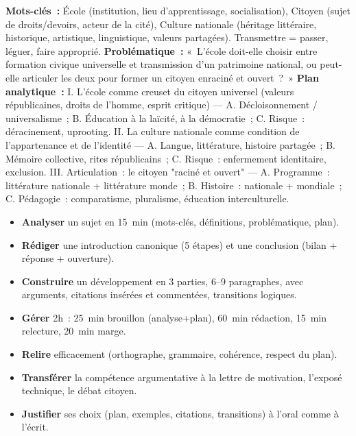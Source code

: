 \documentclass[11pt]{article}
\begin{document}
\begin{corrige}
\textbf{Mots-clés~:} École (institution, lieu d'apprentissage, socialisation), Citoyen (sujet de droits/devoirs, acteur de la cité), Culture nationale (héritage littéraire, historique, artistique, linguistique, valeurs partagées). Transmettre = passer, léguer, faire approprié.
\textbf{Problématique~:} «~L'école doit-elle choisir entre formation civique universelle et transmission d'un patrimoine national, ou peut-elle articuler les deux pour former un citoyen enraciné et ouvert~?~»
\textbf{Plan analytique~:}
I. L'école comme creuset du citoyen universel (valeurs républicaines, droits de l'homme, esprit critique) — A. Décloisonnement / universalisme~; B. Éducation à la laïcité, à la démocratie~; C. Risque~: déracinement, uprooting.
II. La culture nationale comme condition de l'appartenance et de l'identité — A. Langue, littérature, histoire partagée~; B. Mémoire collective, rites républicains~; C. Risque~: enfermement identitaire, exclusion.
III. Articulation~: le citoyen "raciné et ouvert" — A. Programme~: littérature nationale + littérature monde~; B. Histoire~: nationale + mondiale~; C. Pédagogie~: comparatisme, pluralisme, éducation interculturelle.
\end{corrige}

\begin{aretenir}
\begin{itemize}
    \item \textbf{Analyser} un sujet en 15~min (mots-clés, définitions, problématique, plan).
    \item \textbf{Rédiger} une introduction canonique (5 étapes) et une conclusion (bilan + réponse + ouverture).
    \item \textbf{Construire} un développement en 3 parties, 6--9 paragraphes, avec arguments, citations insérées et commentées, transitions logiques.
    \item \textbf{Gérer} 2h~: 25~min brouillon (analyse+plan), 60~min rédaction, 15~min relecture, 20~min marge.
    \item \textbf{Relire} efficacement (orthographe, grammaire, cohérence, respect du plan).
    \item \textbf{Transférer} la compétence argumentative à la lettre de motivation, l'exposé technique, le débat citoyen.
    \item \textbf{Justifier} ses choix (plan, exemples, citations, transitions) à l'oral comme à l'écrit.
\end{itemize}
\end{aretenir}
\end{document}
